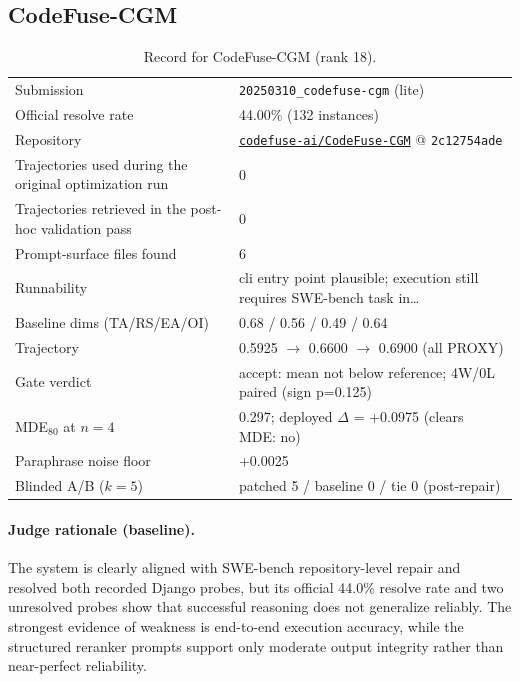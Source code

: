 \subsection{CodeFuse-CGM}
\label{app:agent18}
\begin{table}[h]\centering\scriptsize
\caption{Record for CodeFuse-CGM (rank 18).}
\begin{tabular}{lp{8.2cm}}\toprule
Submission & \texttt{20250310\_\allowbreak{}codefuse-cgm} (lite) \\
Official resolve rate & 44.00\% (132 instances) \\
Repository & \href{https://github.com/codefuse-ai/CodeFuse-CGM}{\texttt{codefuse-ai/CodeFuse-CGM}} @ \texttt{2c12754ade} \\
Trajectories used during the original optimization run & 0 \\
Trajectories retrieved in the post-hoc validation pass & 0 \\
Prompt-surface files found & 6 \\
Runnability & cli entry point plausible; execution still requires SWE-bench task in\ldots{} \\
Baseline dims (TA/RS/EA/OI) & 0.68 / 0.56 / 0.49 / 0.64 \\
Trajectory & 0.5925 $\to$ 0.6600 $\to$ 0.6900 (all PROXY) \\
Gate verdict & accept: mean not below reference; 4W/0L paired (sign p=0.125) \\
MDE$_{80}$ at $n{=}4$ & 0.297; deployed $\Delta$ = +0.0975 (clears MDE: no) \\
Paraphrase noise floor & +0.0025 \\
Blinded A/B ($k{=}5$) & patched 5 / baseline 0 / tie 0 (post-repair) \\
\bottomrule\end{tabular}\end{table}
\paragraph{Judge rationale (baseline).}
The system is clearly aligned with SWE-bench repository-level repair and resolved both recorded Django probes, but its official 44.0\% resolve rate and two unresolved probes show that successful reasoning does not generalize reliably. The strongest evidence of weakness is end-to-end execution accuracy, while the structured reranker prompts support only moderate output integrity rather than near-perfect reliability.
